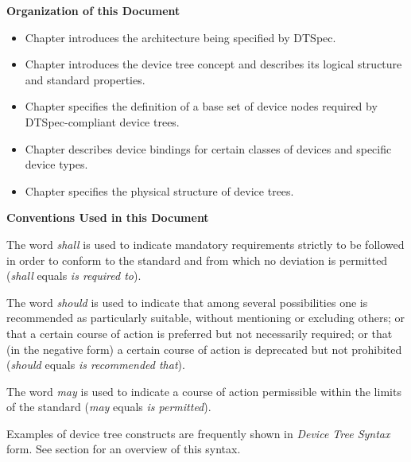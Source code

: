 \documentclass[a4paper,10pt,oneside]{sphinxmanual}
\begin{document}
\textbf{Organization of this Document}
\begin{itemize}
\item {} 
Chapter {\hyperref[introduction:chapter\string-introduction]{}} introduces the architecture being
specified by DTSpec.

\item {} 
Chapter {\hyperref[devicetree\string-basics:chapter\string-devicetree]{}} introduces the device tree concept
and describes its logical structure and standard properties.

\item {} 
Chapter {\hyperref[devicenodes:chapter\string-device\string-node\string-requirements]{}} specifies the
definition of a base set of device nodes required by DTSpec-compliant
device trees.

\item {} 
Chapter {\hyperref[device\string-bindings:chapter\string-device\string-bindings]{}} describes device bindings for
certain classes of devices and specific device types.

\item {} 
Chapter {\hyperref[flattened\string-format:chapter\string-fdt\string-structure]{}} specifies the physical structure
of device trees.

\end{itemize}

\textbf{Conventions Used in this Document}

The word \emph{shall} is used to indicate mandatory requirements strictly to
be followed in order to conform to the standard and from which no
deviation is permitted (\emph{shall} equals \emph{is required to}).

The word \emph{should} is used to indicate that among several possibilities
one is recommended as particularly suitable, without mentioning or
excluding others; or that a certain course of action is preferred but
not necessarily required; or that (in the negative form) a certain
course of action is deprecated but not prohibited (\emph{should} equals \emph{is
recommended that}).

The word \emph{may} is used to indicate a course of action permissible within
the limits of the standard (\emph{may} equals \emph{is permitted}).

Examples of device tree constructs are frequently shown in \emph{Device Tree
Syntax} form. See section {\hyperref[source\string-language:chapter\string-devicetree\string-source\string-format]{}} for
an overview of this syntax.
\end{document}
